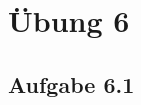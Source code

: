 \documentclass{standalone}
\begin{document}
\section{Übung 6}
\subsection{Aufgabe 6.1}
\end{document}
